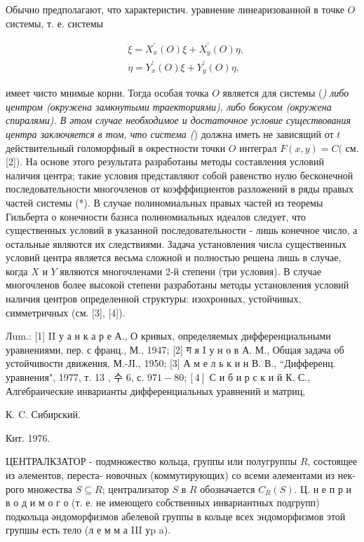 \documentclass[10pt]{article}
\begin{document}
Обычно предполагают, что характеристич. уравнение линеаризованной в точке $O$ системы, т. е. системы



\[

\begin{aligned}

& \dot{\xi}=X_{x}^{\prime}(O) \xi+X_{y}^{\prime}(O) \eta, \\

& \dot{\eta}=Y_{x}^{\prime}(O) \xi+Y_{y}^{\prime}(O) \eta,

\end{aligned}

\]



имеет чисто мнимые корни. Тогда особая точка $O$ является для системы (\textit{) либо центром (окружена замкнутыми траекториями), либо бокусом (окружена спиралями). В әтом случае необходимое и достаточное условие существования центра заключяется в том, что система (}) должна иметь не зависящий от $t$ действительный голоморфный в окрестности точки $O$ интеграл $F(x, y)=C($ см. [2]). На основе этого результата разработаны методы составления условий наличия центра; такие условия представляют собой равенство нулю бесконечной последовательности многочленов от коэфффициентов разложений в ряды правых частей системы (*). В случае полиномиальных правых частей из теоремы Гильберта о конечности базиса полиномиальных идеалов следует, что существенных условий в указанной последовательности - лишь конечное число, а остальные являются их следствиями. Задача установления числа существенных условий центра является весьма сложной и полностью решена лишь в случае, когда $X$ и $Y$ являются многочленами 2-й степени (три условия). В случае многочленов более высокой степени разработаны методы установления условий наличия центров определенной структуры: изохронных, устойчивых, симметричных (см. [3], [4]).



Лum.: [1] II у а н к а р е А., О кривых, определяемых дифференциальными уравнениями, пер. с франц., М., 1947; [2] ग я I у н о в А. М., Общая задача об устойчивости движения, М.-ЈI., 1950; [3] А м е л ь к и н В. В., “Дифференц. уравнения", 1977, т. 13 , 수 6, с. $971-80 ;[4]$ С и б и р с к и й К. С., Алгебраические инварианты дифференциальных уравнений и матриц,

К. C. Сибирский.

Кит. 1976.



ЦЕНТРАЛКЗАТОР - подмножество кольца, группы или полугруппы $R$, состоящее из әлементов, переста- новочных (коммутирующих) со всеми әлементами из нек-рого множества $S \subseteq R$; централизатор $S$ в $R$ обозначается $C_{R}(S)$. Ц. н е п р и в о д и м о г о (т. е. не имеющего собственных инвариантных подгрупп) подкольца әндоморфизмов абелевой группы в кольце всех эндоморфизмов этой групшы есть тело (л е м м а III уp a).
\end{document}
